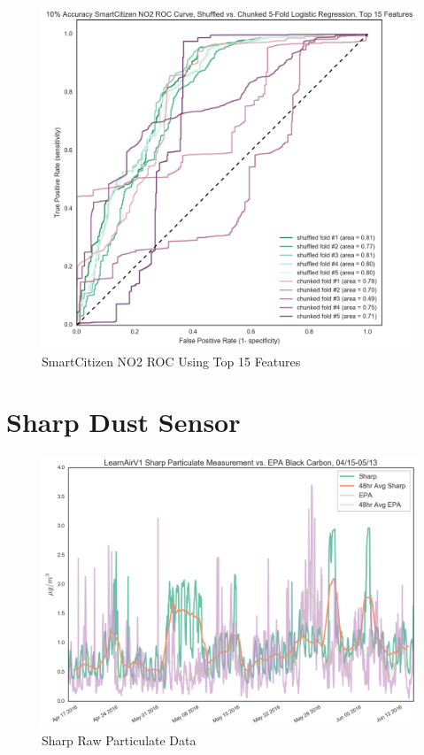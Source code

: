 \begin{figure}[htb]
 	\includegraphics[width=\textwidth]{figs/sck_no2_10_roc_pruned_features}               
 	 \caption{SmartCitizen NO2 ROC Using Top 15 Features}
  	\label{fig:sck_no2_10_roc_pruned_features}
\end{figure}


\FloatBarrier
\section{Sharp Dust Sensor}
\FloatBarrier

\begin{figure}[htb]
 	\includegraphics[width=\textwidth]{figs/sharp_raw}               
 	 \caption{Sharp Raw Particulate Data}
  	\label{fig:sharp_raw}
\end{figure}


